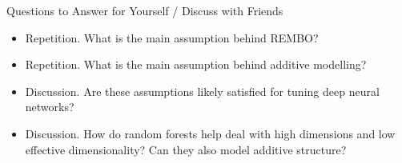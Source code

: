 \begin{frame}[c]{Questions to Answer for Yourself / Discuss with Friends}

\begin{itemize}

\item \alert{Repetition.} What is the main assumption behind REMBO?
\medskip

\item \alert{Repetition.} What is the main assumption behind additive modelling? 
\medskip

\item \alert{Discussion.} Are these assumptions likely satisfied for tuning deep neural networks?
\medskip

\item \alert{Discussion.} How do random forests help deal with high dimensions and low effective dimensionality? Can they also model additive structure?


\end{itemize}
\end{frame}
